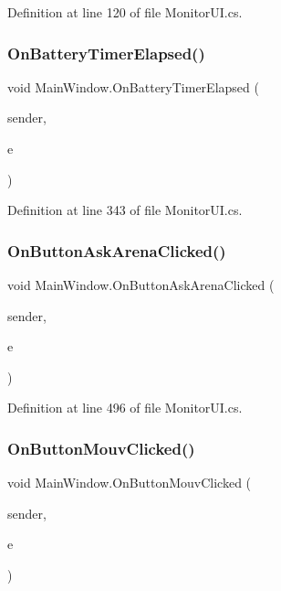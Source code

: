 Definition at line 120 of file Monitor\+U\+I.\+cs.

\mbox{\label{class_main_window_af303b70c08cda04a76f6418f727c4891}} 
\subsubsection{On\+Battery\+Timer\+Elapsed()}
{\footnotesize\ttfamily void Main\+Window.\+On\+Battery\+Timer\+Elapsed (\begin{DoxyParamCaption}\item[{object}]{sender,  }\item[{System.\+Timers.\+Elapsed\+Event\+Args}]{e }\end{DoxyParamCaption})\hspace{0.3cm}{\ttfamily [private]}}



Definition at line 343 of file Monitor\+U\+I.\+cs.

\mbox{\label{class_main_window_a31e299085d6286d680bd488c73fdff82}} 
\subsubsection{On\+Button\+Ask\+Arena\+Clicked()}
{\footnotesize\ttfamily void Main\+Window.\+On\+Button\+Ask\+Arena\+Clicked (\begin{DoxyParamCaption}\item[{object}]{sender,  }\item[{Event\+Args}]{e }\end{DoxyParamCaption})\hspace{0.3cm}{\ttfamily [protected]}}



Definition at line 496 of file Monitor\+U\+I.\+cs.

\mbox{\label{class_main_window_a7f8d06747f887216ab8c941ad10cb48b}} 
\subsubsection{On\+Button\+Mouv\+Clicked()}
{\footnotesize\ttfamily void Main\+Window.\+On\+Button\+Mouv\+Clicked (\begin{DoxyParamCaption}\item[{object}]{sender,  }\item[{Event\+Args}]{e }\end{DoxyParamCaption})\hspace{0.3cm}{\ttfamily [protected]}}



